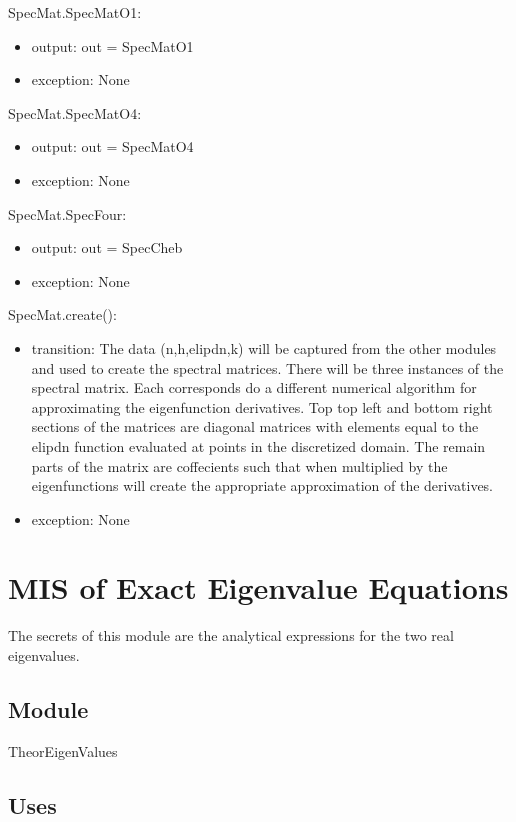 \documentclass[12pt, titlepage]{article}
\begin{document}
SpecMat.SpecMatO1:
\begin{itemize}
	\item output: out = SpecMatO1 
	\item exception: None 
\end{itemize}

SpecMat.SpecMatO4:
\begin{itemize}
	\item output: out = SpecMatO4
	\item exception: None
\end{itemize}

SpecMat.SpecFour:
\begin{itemize}
	\item output: out = SpecCheb 
	\item exception: None
\end{itemize}

SpecMat.create():
\begin{itemize}
	\item transition: The data (n,h,elipdn,k) will be captured from the other 
	modules and used to create the spectral matrices. There will be three 
	instances of the spectral matrix. Each corresponds do a different numerical 
	algorithm for approximating the eigenfunction derivatives. Top top left and 
	bottom right sections of the matrices are diagonal matrices with elements 
	equal to the elipdn function evaluated at points in the discretized domain. 
	The remain parts of the matrix are coffecients such that when multiplied by 
	the eigenfunctions will create the appropriate approximation of the 
	derivatives. 
	\item exception: None
\end{itemize}

\newpage

\section{MIS of Exact Eigenvalue Equations} 

The secrets of this module are the analytical expressions for the two real 
eigenvalues. 

\subsection{Module}

TheorEigenValues

\subsection{Uses}
\end{document}
